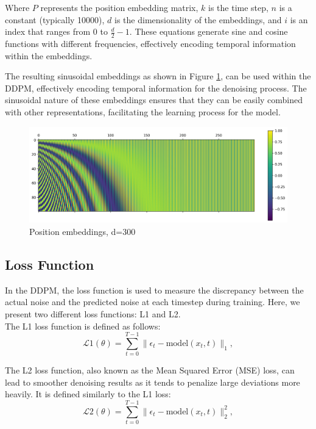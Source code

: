 \documentclass[letterpaper]{article} %
\begin{document}
Where $P$ represents the position embedding matrix, $k$ is the time step, $n$ is a constant (typically 10000), $d$ is the dimensionality of the embeddings, and $i$ is an index that ranges from 0 to $\frac{d}{2} - 1$. These equations generate sine and cosine functions with different frequencies, effectively encoding temporal information within the embeddings.

The resulting sinusoidal embeddings as shown in Figure \ref{fig:figure8}, can be used within the DDPM, effectively encoding temporal information for the denoising process. The sinusoidal nature of these embeddings ensures that they can be easily combined with other representations, facilitating the learning process for the model.

\begin{figure}[htbp]
    \centering
    \includegraphics[width=1.0\linewidth]{f8.png} %
    \caption{Position embeddings, d=300}
    \label{fig:figure8}
\end{figure}

\subsection{Loss Function}
In the DDPM, the loss function is used to measure the discrepancy between the actual noise and the predicted noise at each timestep during training. Here, we present two different loss functions: L1 and L2.\\

\noindent The L1 loss function is defined as follows:
\begin{equation}
\mathcal{L}{\text{1}}(\theta) = \sum_{t=0}^{T-1} \lVert \epsilon_t - \text{model}(x_t, t) \rVert_1,
\end{equation}
    
\noindent The L2 loss function, also known as the Mean Squared Error (MSE) loss, can lead to smoother denoising results as it tends to penalize large deviations more heavily. It is defined similarly to the L1 loss:
\begin{equation}
\mathcal{L}{\text{2}}(\theta) = \sum_{t=0}^{T-1} \lVert \epsilon_t - \text{model}(x_t, t) \rVert_2^2,
\end{equation}
\end{document}
